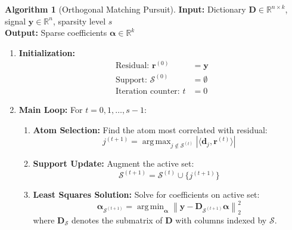\documentclass[12pt]{article}
\renewcommand{\vec}[1]{\mathbf{#1}}
\DeclareMathOperator{\argmin}{arg\,min}
\DeclareMathOperator{\argmax}{arg\,max}
\newcommand{\norm}[1]{\left\|#1\right\|}
\newcommand{\inner}[2]{\langle #1, #2 \rangle}
\theoremstyle{definition}
\newtheorem{algorithm}[theorem]{Algorithm}
\begin{document}
\begin{algorithm}[Orthogonal Matching Pursuit]
    \label{alg:omp}
    \textbf{Input:} Dictionary $\mathbf{D} \in \mathbb{R}^{n \times k}$, signal $\vec{y} \in \mathbb{R}^n$, sparsity level $s$\\
    \textbf{Output:} Sparse coefficients $\vec{\alpha} \in \mathbb{R}^k$
    \begin{enumerate}[label=\textbf{\arabic*.}]
        \item \textbf{Initialization:}
              \begin{align}
                  \text{Residual: } \vec{r}^{(0)}    & = \vec{y}   \\
                  \text{Support: } \mathcal{S}^{(0)} & = \emptyset \\
                  \text{Iteration counter: } t       & = 0
              \end{align}

        \item \textbf{Main Loop:} For $t = 0, 1, \ldots, s-1$:
              \begin{enumerate}[label=\textbf{(\alph*)}]
                  \item \textbf{Atom Selection:} Find the atom most correlated with residual:
                        \begin{equation}
                            j^{(t+1)} = \argmax_{j \notin \mathcal{S}^{(t)}} |\inner{\vec{d}_j}{\vec{r}^{(t)}}|
                        \end{equation}

                  \item \textbf{Support Update:} Augment the active set:
                        \begin{equation}
                            \mathcal{S}^{(t+1)} = \mathcal{S}^{(t)} \cup \{j^{(t+1)}\}
                        \end{equation}

                  \item \textbf{Least Squares Solution:} Solve for coefficients on active set:
                        \begin{equation}
                            \vec{\alpha}_{\mathcal{S}^{(t+1)}} = \argmin_{\vec{\alpha}} \norm{\vec{y} - \mathbf{D}_{\mathcal{S}^{(t+1)}}\vec{\alpha}}_2^2
                        \end{equation}
                        where $\mathbf{D}_{\mathcal{S}}$ denotes the submatrix of $\mathbf{D}$ with columns indexed by $\mathcal{S}$.


\end{enumerate}
\end{enumerate}
\end{algorithm}
\end{document}
